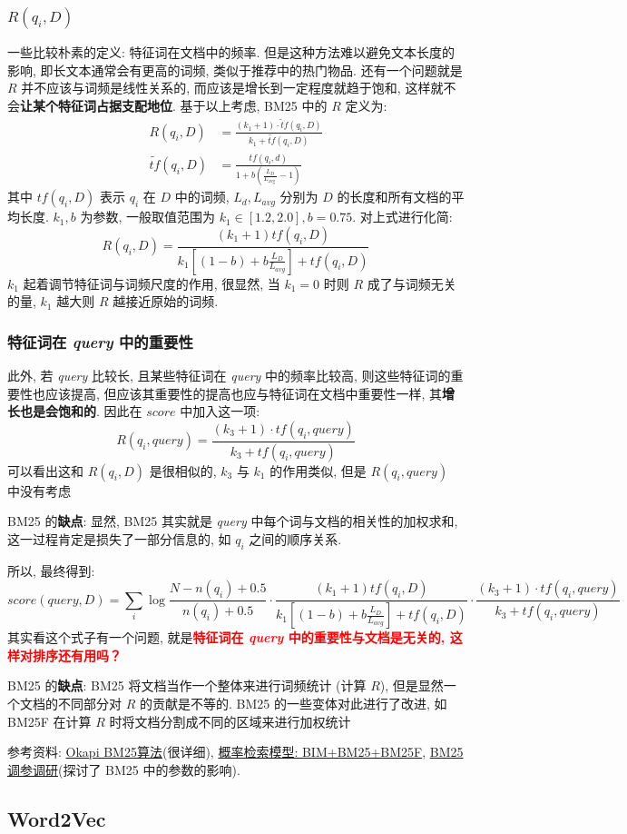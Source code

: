 \subsubsection{$R(q_i, D)$}
一些比较朴素的定义: 特征词在文档中的频率. 但是这种方法难以避免文本长度的影响, 即长文本通常会有更高的词频, 类似于推荐中的热门物品. 还有一个问题就是 $R$ 并不应该与词频是线性关系的, 而应该是增长到一定程度就趋于饱和, 这样就不会\textbf{让某个特征词占据支配地位}. 基于以上考虑, BM25 中的 $R$ 定义为:
$$
\begin{aligned}
	R\left(q_{i}, D\right) &=\frac{\left(k_{1}+1\right) \cdot \tilde{t} f\left(q_{i}, D\right)}{k_{1}+\tilde{tf}\left(q_{i}, D\right)} \\
	\tilde{t f}\left(q_{i}, D\right) &=\frac{t f\left(q_{i}, d\right)}{1+b\left(\frac{L_{D}}{L_{\text {avg }}}-1\right)}
\end{aligned}
$$
其中 $tf(q_i, D)$ 表示 $q_i$ 在 $D$ 中的词频, $L_d, L_{avg}$ 分别为 $D$ 的长度和所有文档的平均长度. $k_1, b$ 为参数, 一般取值范围为 $k_1 \in [1.2, 2.0], b=0.75$. 对上式进行化简:
$$
R(q_i, D) = \frac{(k_1+1) tf(q_i, D)}{k_1[(1 - b) + b \frac{L_D}{L_{avg}}] + tf(q_i, D)}
$$
$k_1$ 起着调节特征词与词频尺度的作用, 很显然, 当 $k_1=0$ 时则 $R$ 成了与词频无关的量, $k_1$ 越大则 $R$ 越接近原始的词频.

\subsubsection{特征词在 \textit{query} 中的重要性}
此外, 若 \textit{query} 比较长, 且某些特征词在 \textit{query} 中的频率比较高, 则这些特征词的重要性也应该提高, 但应该其重要性的提高也应与特征词在文档中重要性一样, 其\textbf{增长也是会饱和的}. 因此在 $score$ 中加入这一项:
$$
R(q_i, query) = \frac{(k_3 + 1) \cdot tf(q_i, query)}{k_3 + tf(q_i, query)}
$$
可以看出这和 $R(q_i, D)$ 是很相似的, $k_3$ 与 $k_1$ 的作用类似, 但是 $R(q_i, query)$ 中没有考虑

BM25 的\textbf{缺点}: 显然, BM25 其实就是 \textit{query} 中每个词与文档的相关性的加权求和, 这一过程肯定是损失了一部分信息的, 如 $q_i$ 之间的顺序关系. 

所以, 最终得到:
$$
score(query, D) = \sum_{i} \log \frac{N-n\left(q_{i}\right)+0.5}{n\left(q_{i}\right)+0.5} \cdot \frac{(k_1+1) tf(q_i, D)}{k_1[(1 - b) + b \frac{L_D}{L_{avg}}] + tf(q_i, D)} \cdot \frac{(k_3 + 1) \cdot tf(q_i, query)}{k_3 + tf(q_i, query)}
$$
其实看这个式子有一个问题, 就是\textbf{\textcolor{red}{特征词在 \textit{query} 中的重要性与文档是无关的, 这样对排序还有用吗？}}

BM25 的\textbf{缺点}: BM25 将文档当作一个整体来进行词频统计 (计算 $R$), 但是显然一个文档的不同部分对 $R$ 的贡献是不等的. BM25 的一些变体对此进行了改进, 如 BM25F 在计算 $R$ 时将文档分割成不同的区域来进行加权统计

参考资料: \href{https://www.cnblogs.com/geeks-reign/p/Okapi_BM25.html}{Okapi BM25算法}(很详细), \href{https://www.cnblogs.com/bentuwuying/p/6730891.html}{概率检索模型: BIM+BM25+BM25F}, \href{https://www.cnblogs.com/NaughtyBaby/p/9774836.html}{BM25 调参调研}(探讨了 BM25 中的参数的影响).

\subsection{Word2Vec}
